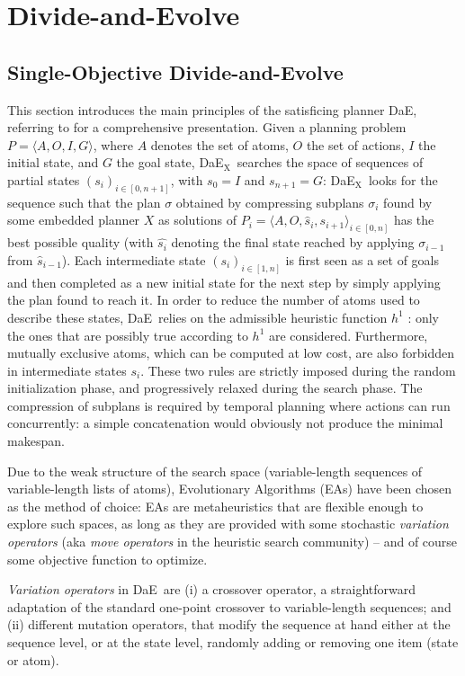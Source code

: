 \documentclass[letterpaper]{article}
\def\DAE{{\sc DaE}}
\def\DAEX{{\sc DaE$_{\text{X}}$}}
\begin{document}
\section{Divide-and-Evolve}
\label{sec:DAE}

\subsection{Single-Objective Divide-and-Evolve}
This section introduces the main principles of the satisficing planner \DAE, referring to \cite{Bibai2010} for a comprehensive presentation.
Given a planning problem $P=\langle A, O, I, G\rangle$, where $A$ denotes the set of atoms, $O$ the set of actions, $I$ the initial state, and $G$ the goal state, \DAEX\ searches the space of sequences of partial states $(s_i)_{i\in [0,n+1]}$, with $s_0=I$ and $s_{n+1}=G$: \DAEX\ looks for the sequence such that the plan $\sigma$ obtained by compressing subplans $\sigma_i$ found by some embedded planner $X$ as solutions of $P_i=\langle A, O, \hat{s}_i, s_{i+1}\rangle_{i\in[0, n]}$ has the best possible quality (with $\hat{s_i}$ denoting the final state reached by applying $\sigma_{i-1}$ from $\hat{s}_{i-1}$). 
Each intermediate state $(s_i)_{i\in [1,n]}$ is first seen as a set of goals and then completed as a new initial state for the next step by simply applying the plan found to reach it.
In order to reduce the number of atoms used to describe these states, \DAE\ relies on the admissible heuristic function $h^1$ \cite{HaslumGeffner-AIPS-2000}: only the ones that are possibly true according to $h^1$ are considered.
Furthermore, mutually exclusive atoms, which can be computed at low cost, are also forbidden in intermediate states $s_i$. These two rules are strictly imposed during the random initialization phase, and progressively relaxed during the search phase.
The compression of subplans is required by temporal planning where actions can run concurrently: a simple concatenation would obviously not produce the minimal makespan.

Due to the weak structure of the search space (variable-length sequences of variable-length lists of atoms), Evolutionary Algorithms (EAs) have been chosen as the method of choice: EAs are metaheuristics that are flexible enough to explore such spaces, as long as they are provided with some stochastic {\em variation operators} (aka {\em move operators} in the heuristic search community) -- and of course some objective function to optimize. 

{\em Variation operators} in \DAE\ are (i) a crossover operator, a straightforward adaptation of the standard one-point crossover to variable-length sequences; and (ii) different mutation operators, that modify the sequence at hand either at 
the sequence level, or at the state level, randomly adding or removing one item (state or atom). 
\end{document}
